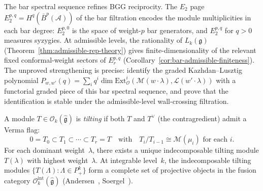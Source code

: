 \begin{remark}\label{rem:bgg-bar-spectral}
The bar spectral sequence refines BGG reciprocity. The $E_2$ page
$E_2^{p,q} = H^q(\bar{B}^p(\mathcal{A}))$ of the bar filtration encodes
the module multiplicities in each bar degree: $E_2^{p,0}$ is the space
of weight-$p$ bar generators, and $E_2^{p,q}$ for $q > 0$ measures
syzygies. At admissible levels, the rationality of $L_k(\mathfrak{g})$
\textup{(}Theorem~\textup{\ref{thm:admissible-rep-theory}}\textup{)}
gives finite-dimensionality of the relevant fixed conformal-weight
sectors of $E_r^{p,q}$
\textup{(}Corollary~\textup{\ref{cor:bar-admissible-finiteness}}\textup{)}.
The unproved strengthening is precise: identify the graded
Kazhdan--Lusztig polynomial
$P_{w,w'}(q)=\sum_i q^i
\dim\mathrm{Ext}^i_{\mathcal O}
(\mathcal M(w\cdot\lambda),\mathcal L(w'\cdot\lambda))$
with a functorial graded piece of this bar spectral sequence, and prove
that the identification is stable under the admissible-level
wall-crossing filtration.
\end{remark}

\begin{definition}\label{def:tilting-module}
A module $T \in \mathcal{O}_k(\widehat{\mathfrak{g}})$ is
\emph{tilting} if both $T$ and $T^\vee$ (the contragredient)
admit a Verma flag:
\[
0 = T_0 \subset T_1 \subset \cdots \subset T_r = T
\quad\text{with}\quad
T_i/T_{i-1} \cong \mathcal{M}(\mu_i)
\text{ for each } i.
\]
For each dominant weight~$\lambda$, there exists a unique
indecomposable tilting module $T(\lambda)$ with highest
weight~$\lambda$. At integrable level~$k$, the indecomposable
tilting modules $\{T(\Lambda) : \Lambda \in P_+^k\}$ form a
complete set of projective objects in the fusion category
$\mathcal{O}_k^{\mathrm{int}}(\widehat{\mathfrak{g}})$
(Andersen~\cite{Andersen92}, Soergel~\cite{Soergel97}).
\end{definition}


